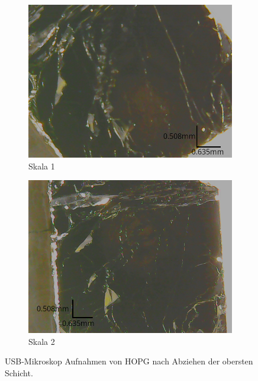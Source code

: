 \begin{figure}[htb]
	\centering
	\begin{subfigure}{0.45\linewidth}
		\centering
		\includegraphics[width=\linewidth]{figs/hopg_skala1.png}
		\caption{Skala 1}
		\label{fig:hopg_skala1}
	\end{subfigure}
	\hspace{0.5cm}
	\begin{subfigure}{0.45\linewidth}
		\centering
		\includegraphics[width=\linewidth]{figs/hopg_skala2.png}
		\caption{Skala 2}
		\label{fig:hopg_skala2}
	\end{subfigure}
	\caption{USB-Mikroskop Aufnahmen von HOPG nach Abziehen der obersten Schicht.}
	\label{fig:usb_mikroskop_hopg}
\end{figure}